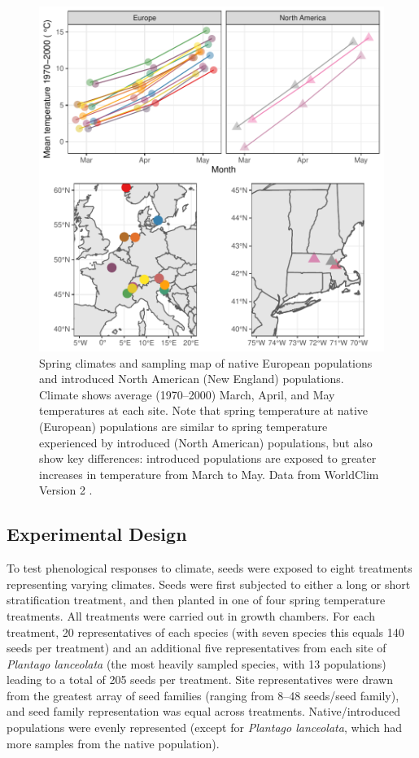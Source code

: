 \documentclass[11pt]{article}\usepackage[]{graphicx}\usepackage[]{color}
\begin{document}
	
	\begin{figure} 
		\centering
		\includegraphics[width=1 \textwidth,trim=0cm 0cm 0cm 0cm, angle=0, scale=.9, origin=c,clip=false]{sampling_sites}
		\caption{Spring climates and sampling map of native European populations and introduced North American (New England) populations. Climate shows average  (1970--2000) March, April, and May temperatures at each site. Note that spring temperature at native (European) populations are similar to spring temperature experienced by introduced (North American) populations, but also show key differences: introduced populations are exposed to greater increases in temperature from March to May. Data from WorldClim Version 2 \parencite{Fick2017}. } %
		\label{fig:sites}
	\end{figure}


	\subsection{Experimental Design} 
	To test phenological responses to climate, seeds were exposed to eight treatments representing varying climates. Seeds were first subjected to either a long or short stratification treatment, and then planted in one of four spring temperature treatments. All treatments were carried out in growth chambers. For each treatment, 20 representatives of each species (with seven species this equals 140 seeds per treatment) and an additional five representatives from each site of \textit{Plantago lanceolata} (the most heavily sampled species, with 13 populations) leading to a total of 205 seeds per treatment. Site representatives were drawn from the greatest array of seed families (ranging from 8--48 seeds/seed family), and seed family representation was equal across treatments. Native/introduced populations were evenly represented (except for \textit{Plantago lanceolata}, which had more samples from the native population).
	
\end{document}

